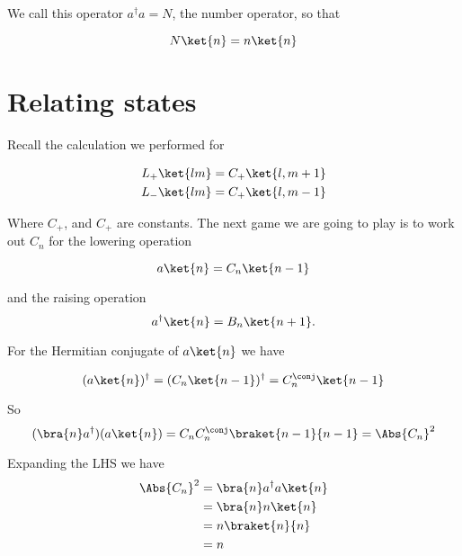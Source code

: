 We call this operator \(a^\dagger a = N\), the number operator, so that

\begin{equation}\label{eqn:PHY356FLecture11:180}
N \ket{n} = n \ket{n}
\end{equation}

\section{Relating states}

Recall the calculation we performed for

\begin{equation}\label{eqn:PHY356FLecture11:200}
\begin{aligned}
L_{+} \ket{lm} &= C_{+} \ket{l, m+1} \\
L_{-} \ket{lm} &= C_{+} \ket{l, m-1}
\end{aligned}
\end{equation}

Where \(C_{+}\), and \(C_{+}\) are constants.  The next game we are going to play is to work out \(C_n\) for the lowering operation

\begin{equation}\label{eqn:PHY356FLecture11:210}
a\ket{n} = C_n \ket{n-1}
\end{equation}

and the raising operation
\begin{equation}\label{eqn:PHY356FLecture11:211}
a^\dagger \ket{n} = B_n \ket{n+1}.
\end{equation}

For the Hermitian conjugate of \(a \ket{n}\) we have

\begin{equation}\label{eqn:PHY356FLecture11:220}
(a \ket{n})^\dagger = ( C_n \ket{n-1} )^\dagger = C_n^\conj \ket{n-1}
\end{equation}

So
\begin{equation}\label{eqn:PHY356FLecture11:230}
(\bra{n} a^\dagger) (a \ket{n}) = C_n C_n^\conj \braket{n-1}{n-1} = \Abs{C_n}^2
\end{equation}

Expanding the LHS we have
\begin{equation}\label{eqn:lecture11harmonicOscillator:740}
\begin{aligned}
\Abs{C_n}^2 &=
\bra{n} a^\dagger a \ket{n} \\
&=
\bra{n} n \ket{n} \\
&=
n \braket{n}{n} \\
&=
n
\end{aligned}
\end{equation}


